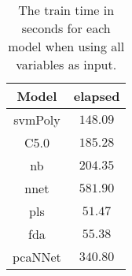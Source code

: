 \begin{table}[!ht]
	\centering
	\begin{tabular}{|c|c|}
		\hline
		Model & elapsed \\ \hline
		svmPoly & $148.09$ \\ \hline
		C5.0 & $185.28$ \\ \hline
		nb & $204.35$ \\ \hline
		nnet & $581.90$ \\ \hline
		pls & $51.47$ \\ \hline
		fda & $55.38$ \\ \hline
		pcaNNet & $340.80$ \\ \hline
	\end{tabular}
	\caption{The train time in seconds for each model when using all variables as input.}
	\label{tab:time:all:train}
\end{table}
